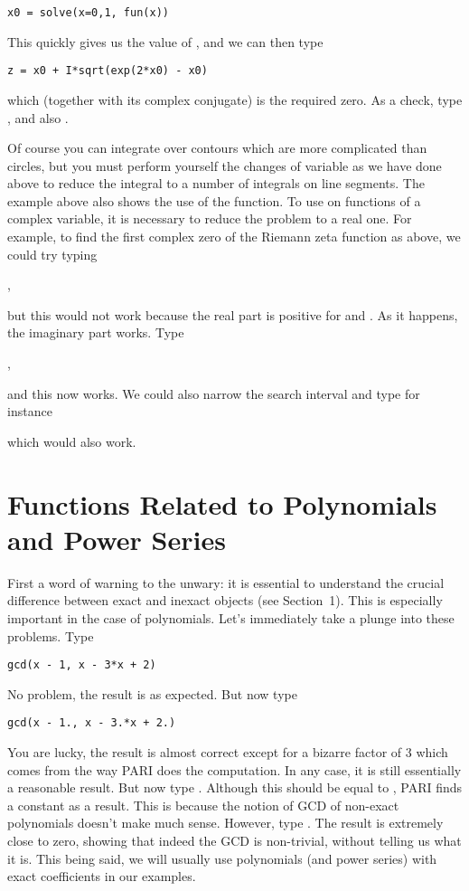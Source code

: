 \centerline{\tt x0 = solve(x=0,1, fun(x))}

This quickly gives us the value of , and we can then type

\centerline{\tt z = x0 + I*sqrt(exp(2*x0) - x0)}

\noindent which (together with its complex conjugate) is the required zero.
As a check, type , and also .

Of course you can integrate over contours which are more complicated than
circles, but you must perform yourself the changes of variable as we have
done above to reduce the integral to a number of integrals on line segments.
\smallskip
%
The example above also shows the use of the  function. To use
 on functions of a complex variable, it is necessary to reduce the
problem to a real one. For example, to find the first complex zero of the
Riemann zeta function as above, we could try typing

,

\noindent but this would not work because the real part is positive for
 and . As it happens, the imaginary part works. Type

,

\noindent and this now works. We could also narrow the search interval and
type for instance


\noindent which would also work.

\section{Functions Related to Polynomials and Power Series}

First a word of warning to the unwary: it is essential to understand the
crucial difference between exact and inexact objects (see Section~1). This
is especially important in the case of polynomials. Let's immediately take
a plunge into these problems. Type

\centerline{\tt gcd(x - 1, x - 3*x + 2)}

 No problem, the result is  as expected. But now type

\centerline{\tt gcd(x - 1., x - 3.*x + 2.)}

 You are lucky, the result is almost correct except for a bizarre factor of
3 which comes from the way PARI does the computation. In any case, it is still
essentially a reasonable result. But now type
.
Although this should be equal to , PARI finds a
constant as a result. This is because the notion of GCD of non-exact
polynomials doesn't make much sense. However, type
.
The result is extremely close to zero, showing that indeed the GCD is
non-trivial, without telling us what it is. This being said, we will usually
use polynomials (and power series) with exact coefficients in our
examples.\smallskip

